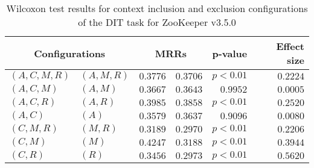 
\begin{table}
\begin{spacing}{1.2}
\centering
\caption{Wilcoxon test results for context inclusion and exclusion configurations of the DIT task for ZooKeeper v3.5.0}
\label{table:versus-wilcox-zookeeper-dit-context}
\begin{tabular}{ll|rr|rr}
\toprule
      \multicolumn{2}{c|}{Configurations} &          \multicolumn{2}{c|}{MRRs} &       p-value & Effect size \\
\midrule
 $(A,C,M,R)$ &  $(A,M,R)$ & $0.3776$ & $0.3706$ & $p<0.01$ &    $0.2224$ \\
   $(A,C,M)$ &    $(A,M)$ & $0.3667$ & $0.3643$ & $0.9952$ &    $0.0005$ \\
   $(A,C,R)$ &    $(A,R)$ & $0.3985$ & $0.3858$ & $p<0.01$ &    $0.2520$ \\
     $(A,C)$ &      $(A)$ & $0.3579$ & $0.3637$ & $0.9096$ &    $0.0080$ \\
   $(C,M,R)$ &    $(M,R)$ & $0.3189$ & $0.2970$ & $p<0.01$ &    $0.2206$ \\
     $(C,M)$ &      $(M)$ & $0.4247$ & $0.3188$ & $p<0.01$ &    $0.3944$ \\
     $(C,R)$ &      $(R)$ & $0.3456$ & $0.2973$ & $p<0.01$ &    $0.5620$ \\
\bottomrule
\end{tabular}

\end{spacing}
\end{table}

